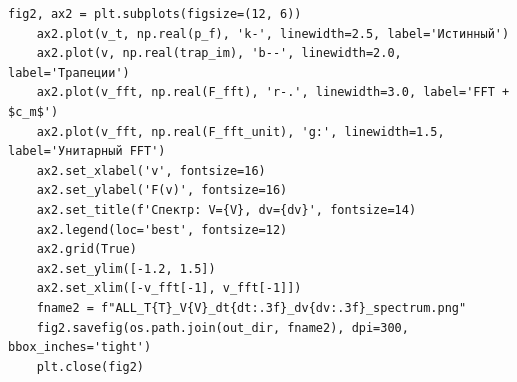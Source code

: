 \documentclass[a4paper, 12pt]{article}
\begin{document}
\begin{lstlisting}[caption={Код для построения сравнения методов}]
    fig2, ax2 = plt.subplots(figsize=(12, 6))
    ax2.plot(v_t, np.real(p_f), 'k-', linewidth=2.5, label='Истинный')
    ax2.plot(v, np.real(trap_im), 'b--', linewidth=2.0, label='Трапеции')
    ax2.plot(v_fft, np.real(F_fft), 'r-.', linewidth=3.0, label='FFT + $c_m$')
    ax2.plot(v_fft, np.real(F_fft_unit), 'g:', linewidth=1.5, label='Унитарный FFT')
    ax2.set_xlabel('v', fontsize=16)
    ax2.set_ylabel('F(v)', fontsize=16)
    ax2.set_title(f'Спектр: V={V}, dv={dv}', fontsize=14)
    ax2.legend(loc='best', fontsize=12)
    ax2.grid(True)
    ax2.set_ylim([-1.2, 1.5])
    ax2.set_xlim([-v_fft[-1], v_fft[-1]])
    fname2 = f"ALL_T{T}_V{V}_dt{dt:.3f}_dv{dv:.3f}_spectrum.png"
    fig2.savefig(os.path.join(out_dir, fname2), dpi=300, bbox_inches='tight')
    plt.close(fig2)

\end{lstlisting}
\end{document}
